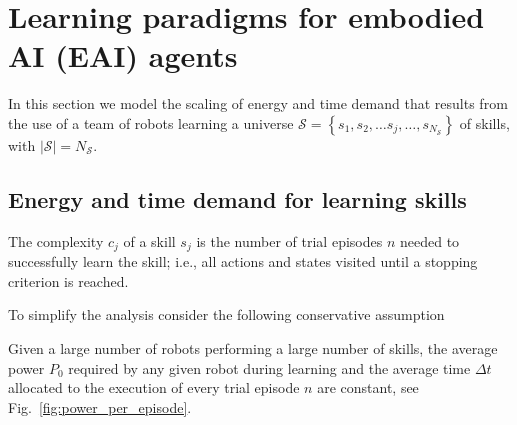 \section{Learning paradigms for embodied AI (EAI) agents}\label{sec:learning_paradigms}
In this section we model the scaling of energy and time demand that results from the use of a team of robots learning a universe $\mathcal{S}=\left\lbrace s_1,s_2,\ldots s_j,\ldots, s_{N_\mathcal{S}}\right\rbrace$ of skills, with $|\mathcal{S}| = N_\mathcal{S}$.

\subsection{Energy and time demand for learning skills}
\begin{tcolorbox}
	\begin{definition}\label{definition:complexity}
		The complexity $c_j$ of a skill $ s_j $  is the number of trial episodes $n$ needed to successfully learn the skill; i.e., all actions and states visited until a stopping criterion is reached. 
	\end{definition}
\end{tcolorbox}

To simplify the analysis consider the following conservative assumption
\begin{tcolorbox}
	\begin{assumption}\label{assumption:time}
		Given a large number of robots performing a large number of skills, the average power $P_0$ required by any given robot during learning and the average time $\Delta t$ allocated to the execution of every trial episode $n$ are constant, see Fig.~\ref{fig:power_per_episode}.
	\end{assumption}
\end{tcolorbox}
